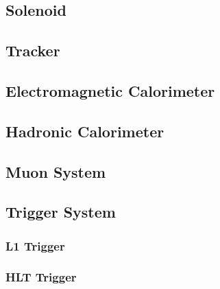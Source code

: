 \subsection{Solenoid}

\subsection{Tracker}

\subsection{Electromagnetic Calorimeter}

\subsection{Hadronic Calorimeter}

\subsection{Muon System}

\subsection{Trigger System}

    \subsubsection{L1 Trigger}

    \subsubsection{HLT Trigger}
